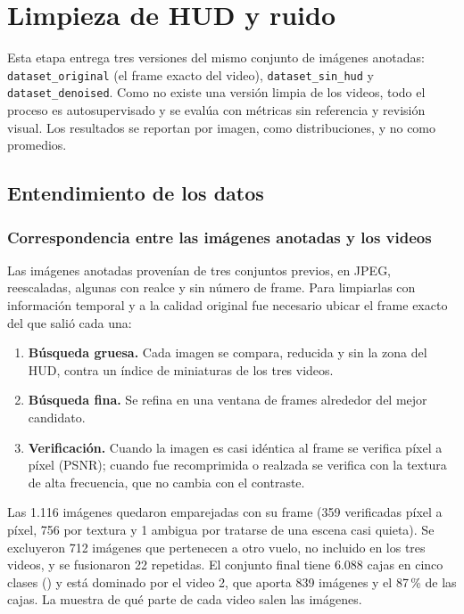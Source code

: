 \section{Limpieza de HUD y ruido}
\label{sec:limpieza}

Esta etapa entrega tres versiones del mismo conjunto de imágenes anotadas: \texttt{dataset\_original} (el frame exacto del video), \texttt{dataset\_sin\_hud} y \texttt{dataset\_denoised}. Como no existe una versión limpia de los videos, todo el proceso es autosupervisado y se evalúa con métricas sin referencia y revisión visual. Los resultados se reportan por imagen, como distribuciones, y no como promedios.

\subsection{Entendimiento de los datos}

\subsubsection{Correspondencia entre las imágenes anotadas y los videos}
Las imágenes anotadas provenían de tres conjuntos previos, en JPEG, reescaladas, algunas con realce y sin número de frame. Para limpiarlas con información temporal y a la calidad original fue necesario ubicar el frame exacto del que salió cada una:

\begin{enumerate}
    \item \textbf{Búsqueda gruesa.} Cada imagen se compara, reducida y sin la zona del HUD, contra un índice de miniaturas de los tres videos.
    \item \textbf{Búsqueda fina.} Se refina en una ventana de frames alrededor del mejor candidato.
    \item \textbf{Verificación.} Cuando la imagen es casi idéntica al frame se verifica píxel a píxel (PSNR); cuando fue recomprimida o realzada se verifica con la textura de alta frecuencia, que no cambia con el contraste.
\end{enumerate}

Las 1.116 imágenes quedaron emparejadas con su frame (359 verificadas píxel a píxel, 756 por textura y 1 ambigua por tratarse de una escena casi quieta). Se excluyeron 712 imágenes que pertenecen a otro vuelo, no incluido en los tres videos, y se fusionaron 22 repetidas. El conjunto final tiene 6.088 cajas en cinco clases () y está dominado por el video 2, que aporta 839 imágenes y el 87\,\% de las cajas. La  muestra de qué parte de cada video salen las imágenes.

